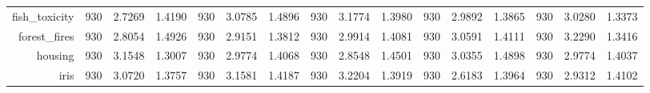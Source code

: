 \begin{table}[htbp]
{\begin{tabular}{rccccccccccccccc}
                  fish\_toxicity                      & 930                                 & \cellcolor[rgb]{ .776,  .937,  .808}\textcolor[rgb]{ 0,  .38,  0}{2.7269} & 1.4190          & 930                            & 3.0785                                                                             & 1.4896          & 930                             & 3.1774                                                                    & 1.3980          & 930                             & 2.9892                                                                    & 1.3865          & 930                             & 3.0280          & 1.3373          \\
                  forest\_fires                       & 930                                 & \cellcolor[rgb]{ .776,  .937,  .808}\textcolor[rgb]{ 0,  .38,  0}{2.8054} & 1.4926          & 930                            & 2.9151                                                                             & 1.3812          & 930                             & 2.9914                                                                    & 1.4081          & 930                             & 3.0591                                                                    & 1.4111          & 930                             & 3.2290          & 1.3416          \\
                  housing                             & 930                                 & 3.1548                                                                    & 1.3007          & 930                            & 2.9774                                                                             & 1.4068          & 930                             & \cellcolor[rgb]{ .776,  .937,  .808}\textcolor[rgb]{ 0,  .38,  0}{2.8548} & 1.4501          & 930                             & 3.0355                                                                    & 1.4898          & 930                             & 2.9774          & 1.4037          \\
                  iris                                & 930                                 & 3.0720                                                                    & 1.3757          & 930                            & 3.1581                                                                             & 1.4187          & 930                             & 3.2204                                                                    & 1.3919          & 930                             & \cellcolor[rgb]{ .776,  .937,  .808}\textcolor[rgb]{ 0,  .38,  0}{2.6183} & 1.3964          & 930                             & 2.9312          & 1.4102          \\

\end{tabular}}
\end{table}
